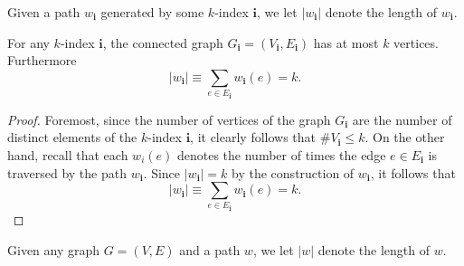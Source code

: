 \begin{definition}
  \label{def:length_of_w_i}
  Given a path $w_\mathbf{i}$ generated by some $k$-index $\mathbf{i}$, we let $|w_\mathbf{i}|$ denote the length of $w_\mathbf{i}$. 
\end{definition}
\begin{lemma}[$|w_\mathbf{i}| = k$ : R-1-2 : lem:abs\_w\_i\_eq\_k]
  \label{lem:abs_w_i_eq_k}
  For any $k$-index $\mathbf{i}$, the connected graph $G_\mathbf{i} = (V_\mathbf{i},E_\mathbf{i})$ has at most $k$ vertices. Furthermore
  \[
  |w_\mathbf{i}| \equiv \sum_{e \in E_\mathbf{i}} w_\mathbf{i}(e) = k.
  \]
\end{lemma}
\begin{proof}
  Foremost, since the number of vertices of the graph $G_\mathbf{i}$ 
  are the number of distinct elements of the $k$-index $\mathbf{i}$, it clearly follows that $\#V_\mathbf{i} \leq k$.
  On the other hand, recall that each $w_i(e)$ denotes the number of times the edge $e \in E_\mathbf{i}$ is traversed by the path $w_\mathbf{i}$. 
  Since $|w_\mathbf{i}| = k$ by the construction of $w_\mathbf{i}$, it follows that
  \[
  |w_\mathbf{i}| \equiv \sum_{e \in E_\mathbf{i}} w_\mathbf{i}(e) = k.
  \]
\end{proof}
\begin{definition}
  \label{def:length_of_w}
  \uses{}
  Given any graph $G=(V,E)$ and a path $w$, we let $|w|$ denote the length of $w$. 
\end{definition}
